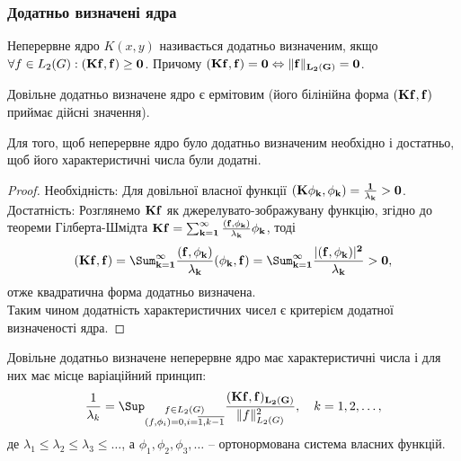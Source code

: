 
\subsubsection{Додатньо визначені ядра}

\begin{definition}
    Неперервне ядро $K(x, y)$ називається додатньо визначеним, якщо $\forall f \in L_2(G): (\bf{K}f, f) \ge 0$. Причому $(\bf{K}f, f) = 0 \Leftrightarrow \|f\|_{L_2(G)} = 0$.
\end{definition}

Довільне додатньо визначене ядро є ермітовим (його білінійна форма $(\bf{K}f, f)$ приймає дійсні значення).

\begin{lemma}
    Для того, щоб неперервне ядро було додатньо визначеним необхідно і достатньо, щоб його характеристичні числа були додатні.
\end{lemma}

\begin{proof}
    Необхідність: Для довільної власної функції $(\bf{K} \phi_k, \phi_k) = \frac{1}{\lambda_k} > 0$. \\

    Достатність: Розглянемо $\bf{K} f$ як джерелувато-зображувану функцію, згідно до теореми Гілберта-Шмідта $\bf{K} f = \sum_{k = 1}^\infty \frac{(f, \phi_k)}{\lambda_k} \phi_k$, тоді \[ (\bf{K}f, f) = \Sum_{k = 1}^\infty \dfrac{(f, \phi_k)}{\lambda_k} (\phi_k, f) = \Sum_{k = 1}^\infty \dfrac{|(f, \phi_k)|^2}{\lambda_k} > 0, \] отже квадратична форма додатньо визначена. \\

    Таким чином додатність характеристичних чисел є критерієм додатної визначеності ядра.
\end{proof}

\begin{lemma}
    Довільне додатньо визначене неперервне ядро має характеристичні числа і для них має місце варіаційний принцип:
    \begin{equation}
        \label{eq:4.16}
        \dfrac{1}{\lambda_k} = \Sup_{\substack{f \in L_2(G) \\ (f, \phi_i) = 0, i = \overline{1, k - 1}}} \dfrac{(\bf{K}f, f)_{L_2(G)}}{\|f\|_{L_2(G)}^2}, \quad k = 1, 2, \ldots,
    \end{equation}
    де $\lambda_1 \le \lambda_2 \le \lambda_3 \le \ldots$, а $\phi_1, \phi_2, \phi_3, \ldots$ -- ортонормована система власних функцій.
\end{lemma}


